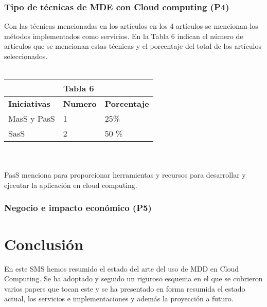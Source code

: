 \documentclass{llncs}
\begin{document}
\subsubsection{Tipo de técnicas de MDE con Cloud computing (P4)}
Con las técnicas mencionadas en los artículos en los 4 artículos se mencionan los métodos implementados como servicios. En la Tabla 6 indican el número de artículos que se mencionan estas técnicas y el porcentaje del total de los artículos seleccionados.
\\ \\
\begin{tabular}{  | p{4cm} | p{2cm} |  | p{3cm} | }
  \hline
  \multicolumn{3}{|c|}{\bf Tabla 6} \\
  \hline
    \bf Iniciativas  & \bf Numero & \bf Porcentaje  \\
  \hline
  MasS y PasS & 1  &25\%  \\
   \hline
    SasS & 2 & 50 \% \\
   \hline
\end{tabular}
\\ \\
PasS menciona para proporcionar herramientas y recursos para desarrollar y ejecutar la aplicación en cloud computing.

\subsubsection{Negocio e impacto económico (P5)}

\section{Conclusión}
En este SMS hemos resumido el estado del arte del uso de MDD en Cloud Computing. Se ha adoptado y seguido un riguroso esquema en el que se cubrieron varios papers que
tocan este y se ha presentado en forma resumida el estado actual, los servicios e implementaciones y además la proyección a futuro.
\end{document}
